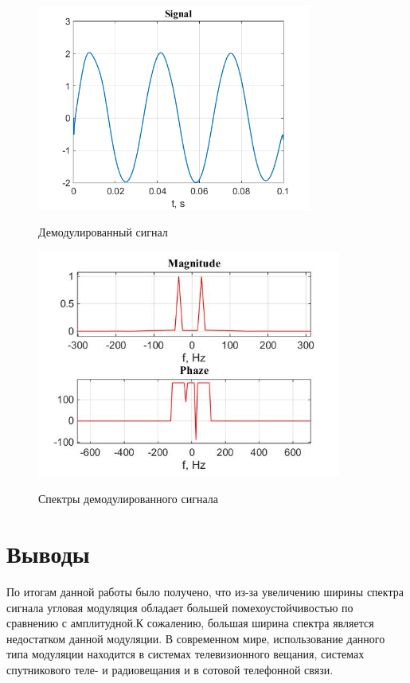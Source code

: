 \documentclass[a4paper,14pt]{article}
\begin{document}
\begin{figure}[h]
\begin{multicols}{1}
\hfill
\includegraphics[width=90mm]{frd}
\hfill
\caption{Демодулированный сигнал}
\label{figBottom}
\hfill
\includegraphics[width=100mm]{frd_spec}
\hfill
\caption{Спектры демодулированного сигнала}
\label{figDown}
\end{multicols}
\end{figure}


\section{Выводы}
\hspace{0,5cm} 
По итогам данной работы было получено, что из-за увеличению ширины спектра сигнала угловая модуляция обладает большей помехоустойчивостью по сравнению с амплитудной.К сожалению, большая ширина спектра является недостатком данной модуляции. В современном мире, использование данного типа модуляции находится  в системах телевизионного вещания, системах спутникового теле- и радиовещания и в сотовой телефонной связи.
\end{document}
